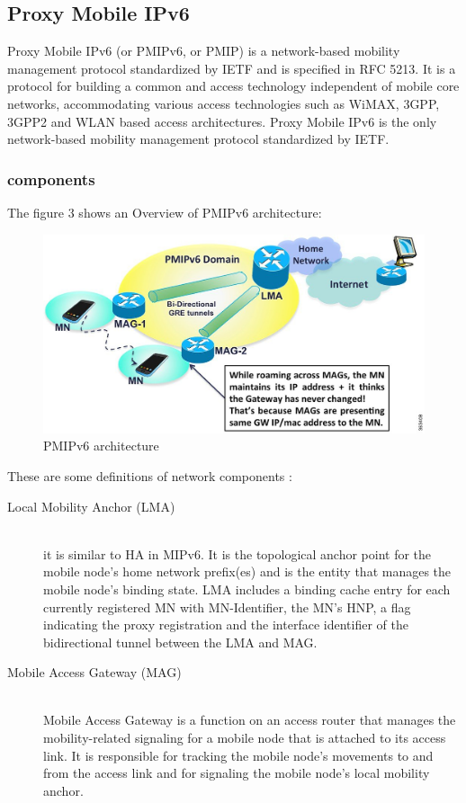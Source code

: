 \documentclass{article}
\begin{document}
\subsection{Proxy Mobile IPv6}

Proxy Mobile IPv6 (or PMIPv6, or PMIP) is a network-based mobility
management protocol standardized by IETF and is specified in RFC
5213. It is a protocol for building a common and access technology
independent of mobile core networks, accommodating various access
technologies such as WiMAX, 3GPP, 3GPP2 and WLAN based access
architectures. Proxy Mobile IPv6 is the only network-based mobility
management protocol standardized by IETF.

\subsubsection{components}

The figure 3 shows an Overview of PMIPv6 architecture: 

\begin{figure}[h!]
  \centering
    \includegraphics[scale=0.5]{reportPictures/figure3.jpg}
  \caption{PMIPv6 architecture}
\end{figure}


These are some definitions of network components : 

\begin{description}
  \item[Local Mobility Anchor (LMA)] \hfill \\ 
it is similar to HA in MIPv6.  It is the topological anchor point for
the mobile node's home network prefix(es) and is the entity that
manages the mobile node's binding state. LMA includes a binding cache
entry for each currently registered MN with MN-Identifier, the MN's
HNP, a flag indicating the proxy registration and the interface
identifier of the bidirectional tunnel between the LMA and MAG.
  \item[Mobile Access Gateway (MAG)] \hfill \\ 
Mobile Access Gateway is a function on an access router that manages
the mobility-related signaling for a mobile node that is attached to
its access link.  It is responsible for tracking the mobile node's
movements to and from the access link and for signaling the mobile
node's local mobility anchor.
\end{description}
\end{document}
